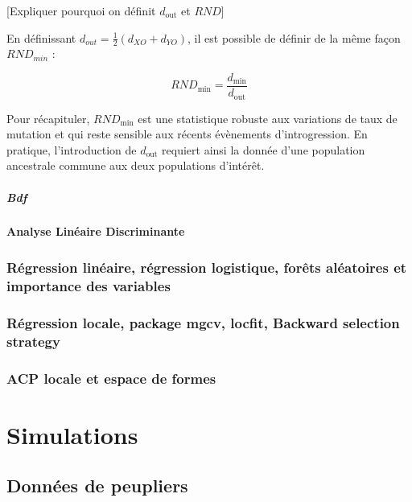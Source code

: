\documentclass[12pt,twoside]{ugathesis}
\begin{document}
  {[}Expliquer pourquoi on définit \(d_{\text{out}}\) et \(RND\){]}
  
  En définissant \(d_{out} = \frac{1}{2}(d_{XO} + d_{YO})\), il est
  possible de définir de la même façon \(RND_{min}\) :
  
  \[RND_{\text{min}} = \frac{d_{\text{min}}}{d_{\text{out}}}\]
  
  Pour récapituler, \(RND_{\text{min}}\) est une statistique robuste aux
  variations de taux de mutation et qui reste sensible aux récents
  évènements d'introgression. En pratique, l'introduction de
  \(d_{\text{out}}\) requiert ainsi la donnée d'une population ancestrale
  commune aux deux populations d'intérêt.
  
  \subparagraph{Bdf}\label{bdf}
  
  \paragraph{Analyse Linéaire
  Discriminante}\label{analyse-lineaire-discriminante}
  
  \subsubsection{Régression linéaire, régression logistique, forêts
  aléatoires et importance des
  variables}\label{regression-lineaire-regression-logistique-forets-aleatoires-et-importance-des-variables}
  
  \subsubsection{Régression locale, package mgcv, locfit, Backward
  selection
  strategy}\label{regression-locale-package-mgcv-locfit-backward-selection-strategy}
  
  \subsubsection{ACP locale et espace de
  formes}\label{acp-locale-et-espace-de-formes}
  
  \newpage
  
  \section{Simulations}\label{simulations}
  
  \subsection{Données de peupliers}\label{donnees-de-peupliers}
  
\end{document}
